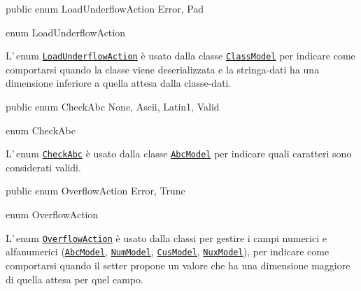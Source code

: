 \documentclass[a4paper,10pt]{report}
\newif\ifesource
\newenvironment{elisting}[1][H]
  {\captionsetup{aboveskip=0pt}\begin{listing}[#1]}
  {\end{listing}%
}
\begin{document}
\ifesource
\begin{lstlisting}[language=java, 
caption=enum LoadUnderflowAction, 
label=lst:LoadUnderflowAction]
public enum LoadUnderflowAction { Error, Pad }
\end{lstlisting}\index{LoadUnderflowAction}
\else
\begin{elisting}
\begin{javacode}
public enum LoadUnderflowAction { Error, Pad }
\end{javacode}
\caption{enum LoadUnderflowAction}\label{lst:LoadUnderflowAction}
\end{elisting}
\fi
L'\,enum \hyperref[lst:LoadUnderflowAction]{\texttt{LoadUnderflowAction}} è 
usato dalla classe \hyperref[lst:ClassModel]{\texttt{ClassModel}} per indicare 
come comportarsi quando la classe viene deserializzata e la stringa-dati ha una 
dimensione inferiore a quella attesa dalla classe-dati.

\ifesource
\begin{lstlisting}[language=java, 
caption=enum CheckAbc, 
label=lst:CheckAbc]
public enum CheckAbc { None, Ascii, Latin1, Valid }
\end{lstlisting}\index{CheckAbc}
\else
\begin{elisting}
\begin{javacode}
public enum CheckAbc { None, Ascii, Latin1, Valid }
\end{javacode}
\caption{enum CheckAbc}\label{lst:CheckAbc}
\end{elisting}
\fi
L'\,enum \hyperref[lst:CheckAbc]{\texttt{CheckAbc}} è usato dalla classe
\hyperref[lst:AbcModel]{\texttt{AbcModel}} per indicare quali caratteri sono
considerati validi.

\ifesource
\begin{lstlisting}[language=java, 
caption=enum OverflowAction, 
label=lst:OverflowAction]
public enum OverflowAction { Error, Trunc }
\end{lstlisting}\index{OverflowAction}
\else
\begin{elisting}
\begin{javacode}
public enum OverflowAction { Error, Trunc }
\end{javacode}
\caption{enum OverflowAction}\label{lst:OverflowAction}
\end{elisting}
\fi
L'\,enum \hyperref[lst:OverflowAction]{\texttt{OverflowAction}} è usato dalla 
classi per gestire i campi numerici e alfanumerici 
(\hyperref[lst:AbcModel]{\texttt{AbcModel}},\break
\hyperref[lst:NumModel]{\texttt{NumModel}},
\hyperref[lst:CusModel]{\texttt{CusModel}},
\hyperref[lst:NuxModel]{\texttt{NuxModel}}), per indicare come comportarsi
quando il setter propone un valore che ha una dimensione maggiore di quella
attesa per quel campo.
\end{document}
